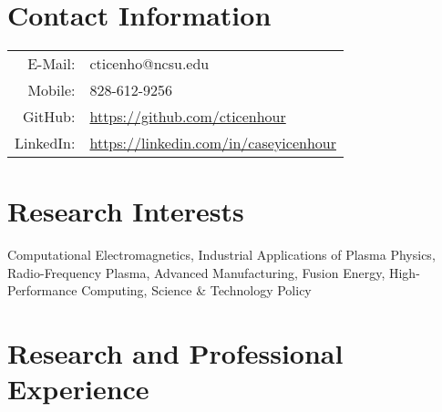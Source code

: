 \documentclass{article}
\title{\vspace{-2.5em}{\huge \textbf{Casey Icenhour}}\vspace{-3em}}
\date{} %
\begin{document}
\maketitle

\section*{Contact Information}

\begin{tabularx}{\textwidth}{r l}
	\hspace{3em} E-Mail:  & \hspace{2em} cticenho@ncsu.edu \\
	\hspace{3em} Mobile: & \hspace{2em} 828-612-9256 \\
	\hspace{3em} GitHub: & \hspace{2em} \url{https://github.com/cticenhour} \\
	\hspace{3em} LinkedIn: & \hspace{2em} \url{https://linkedin.com/in/caseyicenhour}
\end{tabularx}

\section*{Research Interests}

\hspace{0.07\textwidth} \begin{minipage}[t][2em][s]{0.92\textwidth}
	Computational Electromagnetics, Industrial Applications of Plasma Physics, Radio-Frequency Plasma, Advanced Manufacturing, Fusion Energy, High-Performance Computing, Science \& Technology Policy
\end{minipage}

\section*{Research and Professional Experience}
\end{document}
